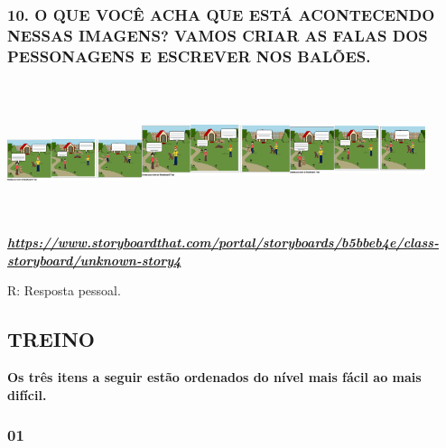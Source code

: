 \subsubsection{10. O QUE VOCÊ ACHA QUE ESTÁ ACONTECENDO NESSAS IMAGENS?
VAMOS CRIAR AS FALAS DOS PESSONAGENS E ESCREVER NOS
BALÕES.}\protect\includegraphics[width=1.55139in,height=1.32153in]{media/image177.png}\protect\includegraphics[width=1.70417in,height=1.53958in]{media/image178.png}\protect\includegraphics[width=1.56667in,height=1.56736in]{media/image179.png}\label{o-que-vocuxea-acha-que-estuxe1-acontecendo-nessas-imagens-vamos-criar-as-falas-dos-pessonagens-e-escrever-nos-baluxf5es.}

\href{https://www.storyboardthat.com/portal/storyboards/b5bbeb4e/class-storyboard/unknown-story4}{\textbf{\emph{https://www.storyboardthat.com/portal/storyboards/b5bbeb4e/class-storyboard/unknown-story4}}}

R: Resposta pessoal.

\subsection{TREINO}\label{treino-6}

\textbf{Os três itens a seguir estão ordenados do nível mais fácil ao mais
difícil. }

\subsubsection{01 }\label{section-23}

